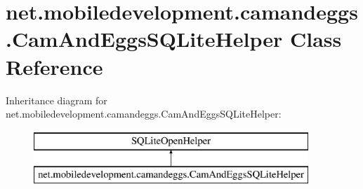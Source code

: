 \hypertarget{classnet_1_1mobiledevelopment_1_1camandeggs_1_1_cam_and_eggs_s_q_lite_helper}{}\section{net.\+mobiledevelopment.\+camandeggs.\+Cam\+And\+Eggs\+S\+Q\+Lite\+Helper Class Reference}
\label{classnet_1_1mobiledevelopment_1_1camandeggs_1_1_cam_and_eggs_s_q_lite_helper}
Inheritance diagram for net.\+mobiledevelopment.\+camandeggs.\+Cam\+And\+Eggs\+S\+Q\+Lite\+Helper\+:\begin{figure}[H]
\begin{center}
\leavevmode
\includegraphics[height=2.000000cm]{classnet_1_1mobiledevelopment_1_1camandeggs_1_1_cam_and_eggs_s_q_lite_helper}
\end{center}
\end{figure}

